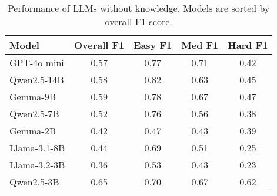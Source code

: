 \begin{table}[h]
\footnotesize  %
\centering
\setlength{\tabcolsep}{4pt}  %
\begin{tabular}{l|c|ccc}
\hline
\textbf{Model} & \textbf{Overall F1} & \textbf{Easy F1} & \textbf{Med F1} & \textbf{Hard F1} \\
\hline
GPT-4o mini & 0.57 & 0.77 & 0.71 & 0.42 \\
Qwen2.5-14B & 0.58 & 0.82 & 0.63 & 0.45 \\
Gemma-9B & 0.59 & 0.78 & 0.67 & 0.47 \\
Qwen2.5-7B & 0.52 & 0.76 & 0.56 & 0.38 \\
Gemma-2B & 0.42 & 0.47 & 0.43 & 0.39 \\
Llama-3.1-8B & 0.44 & 0.69 & 0.51 & 0.25 \\
Llama-3.2-3B & 0.36 & 0.53 & 0.43 & 0.23 \\
Qwen2.5-3B & 0.65 & 0.70 & 0.67 & 0.62 \\
\hline
\end{tabular}
\caption{Performance of LLMs without knowledge. Models are sorted by overall F1 score.
}
\label{tab:llm_performance_without_2}
\end{table}